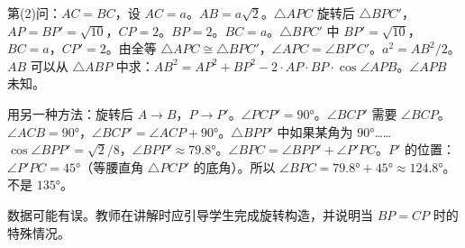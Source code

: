 \documentclass{exam-zh}
\begin{document}
\begin{problem}[points=8]
\begin{solutionblock}
第(2)问：$AC = BC$，设 $AC = a$。$AB = a\sqrt{2}$。$\triangle APC$ 旋转后 $\triangle BPC'$，$AP = BP' = \sqrt{10}$，$CP = 2$。$BP = 2$。$BC = a$。$\triangle BPC'$ 中 $BP' = \sqrt{10}$，$BC = a$，$CP' = 2$。由全等 $\triangle APC \cong \triangle BPC'$，$\angle APC = \angle BP'C'$。$a^2 = AB^2 / 2$。$AB$ 可以从 $\triangle ABP$ 中求：$AB^2 = AP^2 + BP^2 - 2 \cdot AP \cdot BP \cdot \cos \angle APB$。$\angle APB$ 未知。

用另一种方法：旋转后 $A \to B$，$P \to P'$。$\angle PCP' = 90°$。$\angle BCP'$ 需要 $\angle BCP$。$\angle ACB = 90°$，$\angle BCP' = \angle ACP + 90°$。$\triangle BPP'$ 中如果某角为 $90°$……$\cos \angle BPP' = \sqrt{2}/8$，$\angle BPP' \approx 79.8°$。$\angle BPC = \angle BPP' + \angle P'PC$。$P'$ 的位置：$\angle P'PC = 45°$（等腰直角 $\triangle PCP'$ 的底角）。所以 $\angle BPC = 79.8° + 45° \approx 124.8°$。不是 $135°$。

数据可能有误。教师在讲解时应引导学生完成旋转构造，并说明当 $BP = CP$ 时的特殊情况。

  \end{solutionblock}
\end{problem}


\end{document}
